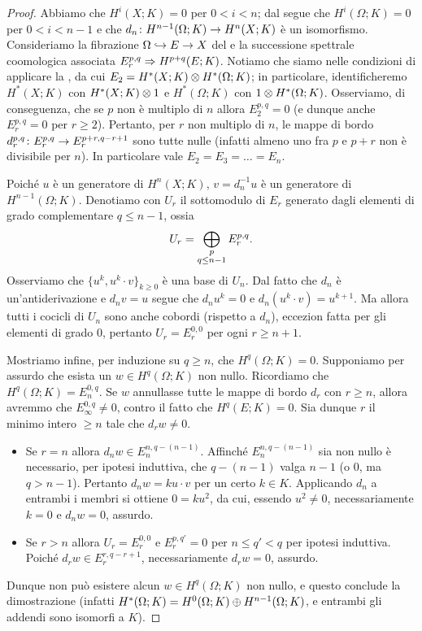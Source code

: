 \begin{proof}
Abbiamo che \(H^i(X;K)=0\) per \(0<i<n\); dal  segue che \(H^i(\Omega;K)=0\) per \(0<i<n-1\) e che \(\map{d_n}{H^{n-1}(\Omega;K)}{H^n(X;K)}\) è un isomorfismo. Consideriamo la fibrazione \(\Omega\hookrightarrow E\to X\) del  e la successione spettrale coomologica associata \(E^{p,q}_r\Rightarrow H^{p+q}(E;K)\). Notiamo che siamo nelle condizioni di applicare la , da cui \(E_2=H^*(X;K)\mathbin{\otimes} H^*(\Omega;K)\); in particolare, identificheremo \(H^*(X;K)\) con \(H^*(X;K)\mathbin{\otimes} 1\) e \(H^*(\Omega;K)\) con \(1\mathbin{\otimes} H^*(\Omega;K)\). Osserviamo, di conseguenza, che se \(p\) non è multiplo di \(n\) allora \(E^{p,q}_2=0\) (e dunque anche \(E^{p,q}_r=0\) per \(r\ge2\)). Pertanto, per \(r\) non multiplo di \(n\), le mappe di bordo \(\map{d^{p,q}_r}{E^{p,q}_r}{E^{p+r,q-r+1}_r}\) sono tutte nulle (infatti almeno uno fra \(p\) e \(p+r\) non è divisibile per \(n\)). In particolare vale \(E_2=E_3=\ldots=E_n\).

Poiché \(u\) è un generatore di \(H^n(X;K)\), \(v=d_n^{-1}u\) è un generatore di \(H^{n-1}(\Omega;K)\). Denotiamo con \(U_r\) il sottomodulo di \(E_r\) generato dagli elementi di grado complementare \(q\le n-1\), ossia
\[
U_r=\bigoplus_{\substack{p\\q\le n-1}}E^{p,q}_r.
\]
Osserviamo che \(\{u^k,u^k\cdot v\}_{k\ge 0}\) è una base di \(U_n\). Dal fatto che \(d_n\) è un'antiderivazione e \(d_nv=u\) segue che \(d_n u^k=0\) e \(d_n(u^k\cdot v)=u^{k+1}\). Ma allora tutti i cocicli di \(U_n\) sono anche cobordi (rispetto a \(d_n\)), eccezion fatta per gli elementi di grado \(0\), pertanto \(U_r=E^{0,0}_r\) per ogni \(r\ge n+1\).

Mostriamo infine, per induzione su \(q\ge n\), che \(H^q(\Omega;K)=0\). Supponiamo per assurdo che esista un \(w\in H^q(\Omega;K)\) non nullo. Ricordiamo che \(H^q(\Omega;K)=E^{0,q}_n\). Se \(w\) annullasse tutte le mappe di bordo \(d_r\) con \(r\ge n\), allora avremmo che \(E^{0,q}_\infty\neq 0\), contro il fatto che \(H^q(E;K)=0\). Sia dunque \(r\) il minimo intero \(\ge n\) tale che \(d_rw\neq 0\).
\begin{itemize}
\item Se \(r=n\) allora \(d_nw\in E^{n,q-(n-1)}_n\). Affinché \(E^{n,q-(n-1)}_n\) sia non nullo è necessario, per ipotesi induttiva, che \(q-(n-1)\) valga \(n-1\) (o \(0\), ma \(q>n-1\)). Pertanto \(d_nw=ku\cdot v\) per un certo \(k\in K\). Applicando \(d_n\) a entrambi i membri si ottiene \(0=ku^2\), da cui, essendo \(u^2\neq 0\), necessariamente \(k=0\) e \(d_nw=0\), assurdo.
\item Se \(r>n\) allora \(U_r=E^{0,0}_r\) e \(E^{p,q'}_r=0\) per \(n\le q'<q\) per ipotesi induttiva. Poiché \(d_rw\in E^{r,q-r+1}_r\), necessariamente \(d_rw=0\), assurdo.
\end{itemize}
Dunque non può esistere alcun \(w\in H^q(\Omega;K)\) non nullo, e questo conclude la dimostrazione (infatti \(H^*(\Omega;K)=H^0(\Omega;K)\mathbin{\oplus} H^{n-1}(\Omega;K)\), e entrambi gli addendi sono isomorfi a \(K\)).
\end{proof}
